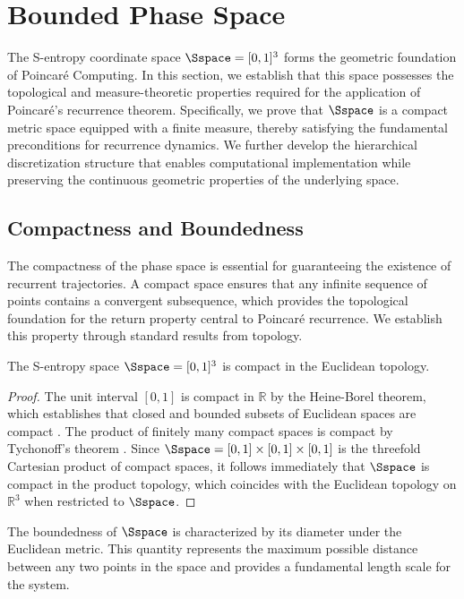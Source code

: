 \section{Bounded Phase Space}
\label{sec:finite_space}

The S-entropy coordinate space $\Sspace = [0,1]^3$ forms the geometric foundation of Poincaré Computing. In this section, we establish that this space possesses the topological and measure-theoretic properties required for the application of Poincaré's recurrence theorem. Specifically, we prove that $\Sspace$ is a compact metric space equipped with a finite measure, thereby satisfying the fundamental preconditions for recurrence dynamics. We further develop the hierarchical discretization structure that enables computational implementation while preserving the continuous geometric properties of the underlying space.

\subsection{Compactness and Boundedness}

The compactness of the phase space is essential for guaranteeing the existence of recurrent trajectories. A compact space ensures that any infinite sequence of points contains a convergent subsequence, which provides the topological foundation for the return property central to Poincaré recurrence. We establish this property through standard results from topology.

\begin{proposition}
\label{prop:compactness}
The S-entropy space $\Sspace = [0,1]^3$ is compact in the Euclidean topology.
\end{proposition}

\begin{proof}
The unit interval $[0,1]$ is compact in $\mathbb{R}$ by the Heine-Borel theorem, which establishes that closed and bounded subsets of Euclidean spaces are compact \citep{rudin1976principles}. The product of finitely many compact spaces is compact by Tychonoff's theorem \citep{kelley1955general}. Since $\Sspace = [0,1] \times [0,1] \times [0,1]$ is the threefold Cartesian product of compact spaces, it follows immediately that $\Sspace$ is compact in the product topology, which coincides with the Euclidean topology on $\mathbb{R}^3$ when restricted to $\Sspace$.
\end{proof}

The boundedness of $\Sspace$ is characterized by its diameter under the Euclidean metric. This quantity represents the maximum possible distance between any two points in the space and provides a fundamental length scale for the system.

